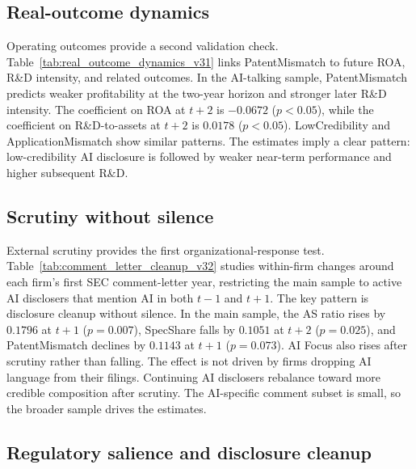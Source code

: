 \subsection{Real-outcome dynamics}

Operating outcomes provide a second validation check. Table~\ref{tab:real_outcome_dynamics_v31} links PatentMismatch to future ROA, R\&D intensity, and related outcomes. In the AI-talking sample, PatentMismatch predicts weaker profitability at the two-year horizon and stronger later R\&D intensity. The coefficient on ROA at $t+2$ is $-0.0672$ ($p<0.05$), while the coefficient on R\&D-to-assets at $t+2$ is $0.0178$ ($p<0.05$). LowCredibility and ApplicationMismatch show similar patterns. The estimates imply a clear pattern: low-credibility AI disclosure is followed by weaker near-term performance and higher subsequent R\&D.



\subsection{Scrutiny without silence}

External scrutiny provides the first organizational-response test. Table~\ref{tab:comment_letter_cleanup_v32} studies within-firm changes around each firm's first SEC comment-letter year, restricting the main sample to active AI disclosers that mention AI in both $t-1$ and $t+1$. The key pattern is disclosure cleanup without silence. In the main sample, the AS ratio rises by $0.1796$ at $t+1$ ($p=0.007$), SpecShare falls by $0.1051$ at $t+2$ ($p=0.025$), and PatentMismatch declines by $0.1143$ at $t+1$ ($p=0.073$). AI Focus also rises after scrutiny rather than falling. The effect is not driven by firms dropping AI language from their filings. Continuing AI disclosers rebalance toward more credible composition after scrutiny. The AI-specific comment subset is small, so the broader sample drives the estimates.



\subsection{Regulatory salience and disclosure cleanup}


